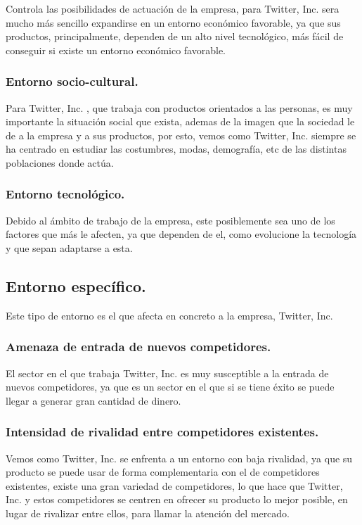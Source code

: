 Controla las posibilidades de actuación de la empresa, para Twitter, Inc. sera mucho más sencillo expandirse en un entorno económico favorable, ya que sus productos, principalmente, dependen de un alto nivel tecnológico, más fácil de conseguir si existe un entorno económico favorable.

\subsubsection{Entorno socio-cultural.}

Para Twitter, Inc. , que trabaja con productos orientados a las personas, es muy importante la situación social que exista, ademas de la imagen que la sociedad le de a la empresa y a sus productos, por esto, vemos como Twitter, Inc. siempre se ha centrado en estudiar las costumbres, modas, demografía, etc de las distintas poblaciones donde actúa.

\subsubsection{Entorno tecnológico.}

Debido al ámbito de trabajo de la empresa, este posiblemente sea uno de los factores que más le afecten, ya que dependen de el, como evolucione la tecnología y que sepan adaptarse a esta.


\subsection{Entorno específico.}

Este tipo de entorno es el que afecta en concreto a la empresa, Twitter, Inc.

\subsubsection{Amenaza de entrada de nuevos competidores.}

El sector en el que trabaja Twitter, Inc. es muy susceptible a la entrada de nuevos competidores, ya que es un sector en el que si se tiene éxito se puede llegar a generar gran cantidad de dinero.

\subsubsection{Intensidad de rivalidad entre competidores existentes.}

Vemos como Twitter, Inc. se enfrenta a un entorno con baja rivalidad, ya que su producto se puede usar de forma complementaria con el de competidores existentes, existe una gran variedad de competidores, lo que hace que Twitter, Inc. y estos competidores se centren en ofrecer su producto lo mejor posible, en lugar de rivalizar entre ellos, para llamar la atención del mercado.

